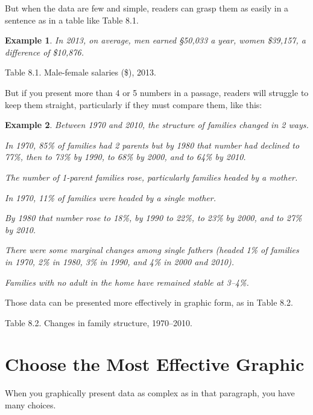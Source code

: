 \documentclass[oneside]{book}
\numberwithin{equation}{section}
\newtheorem{example}{Example}[section]
\begin{document}
But when the data are few and simple, readers can grasp them as easily in a sentence as in a table like Table 8.1.
\begin{example}
    In 2013, on average, men earned \S50,033 a year, women \$39,157, a difference of \$10,876.
\end{example}
\textsf{Table 8.1. Male-female salaries (\$), 2013.}

But if you present more than 4 or 5 numbers in a passage, readers will struggle to keep them straight, particularly if they must compare them, like this:
\begin{example}
    Between 1970 and 2010, the structure of families changed in 2 ways.
    
    In 1970, 85\% of families had 2 parents but by 1980 that number had declined to 77\%, then to 73\% by 1990, to 68\% by 2000, and to 64\% by 2010.
    
    The number of 1-parent families rose, particularly families headed by a mother.
    
    In 1970, 11\% of families were headed by a single mother.
    
    By 1980 that number rose to 18\%, by 1990 to 22\%, to 23\% by 2000, and to 27\% by 2010.
    
    There were some marginal changes among single fathers (headed 1\% of families in 1970, 2\% in 1980, 3\% in 1990, and 4\% in 2000 and 2010).
    
    Families with no adult in the home have remained stable at 3--4\%.
\end{example}
Those data can be presented more effectively in graphic form, as in Table 8.2.

\textsf{Table 8.2. Changes in family structure, 1970--2010.}

\section{Choose the Most Effective Graphic}
When you graphically present data as complex as in that paragraph, you have many choices.
\end{document}
